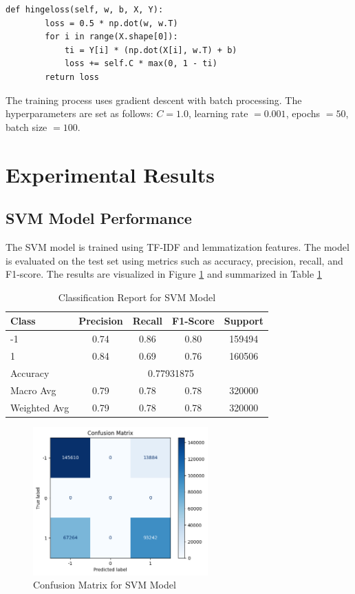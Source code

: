 \documentclass[12pt]{article}
\begin{document}
\begin{verbatim}
def hingeloss(self, w, b, X, Y):
        loss = 0.5 * np.dot(w, w.T)
        for i in range(X.shape[0]):
            ti = Y[i] * (np.dot(X[i], w.T) + b)
            loss += self.C * max(0, 1 - ti)
        return loss
\end{verbatim}

The training process uses gradient descent with batch processing. The hyperparameters are set as follows: $C=1.0$, learning rate $=0.001$, epochs $=50$, batch size $=100$.

\section{Experimental Results}

\subsection{SVM Model Performance}
The SVM model is trained using TF-IDF and lemmatization features. The model is evaluated on the test set using metrics such as accuracy, precision, recall, and F1-score. The results are visualized in Figure \ref{fig:accuracy} and summarized in Table \ref{tab:classification_report}

\begin{table}[H]
    \centering
    \begin{tabular}{lcccc}
    \hline
    Class & Precision & Recall & F1-Score & Support \\
    \hline
    -1 & 0.74 & 0.86 & 0.80 & 159494 \\
    1 & 0.84 & 0.69 & 0.76 & 160506 \\
    \hline
    Accuracy & \multicolumn{4}{c}{0.77931875} \\
    Macro Avg & 0.79 & 0.78 & 0.78 & 320000 \\
    Weighted Avg & 0.79 & 0.78 & 0.78 & 320000 \\
    \hline
    \end{tabular}
    \caption{Classification Report for SVM Model}
    \label{tab:classification_report}
    \end{table}

\begin{figure}[H]
    \centering
    \includegraphics[width=0.6\textwidth]{svm_50epoch_tfidf.png}
    \caption{Confusion Matrix for SVM Model}
    \label{fig:accuracy}
\end{figure}
\end{document}

